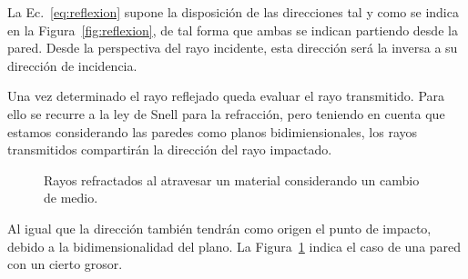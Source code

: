 La Ec.~\eqref{eq:reflexion} supone la disposición de las direcciones tal y como se indica en la Figura~\ref{fig:reflexion}, de tal forma que ambas se indican partiendo desde la pared.
Desde la perspectiva del rayo incidente, esta dirección será la inversa a su dirección de incidencia.


Una vez determinado el rayo reflejado queda evaluar el rayo transmitido.
Para ello se recurre a la ley de Snell para la refracción, pero teniendo en cuenta que estamos considerando las paredes como planos bidimiensionales, los rayos transmitidos compartirán la dirección del rayo impactado.

\begin{figure}[H]
    \centering
    \caption{Rayos refractados al atravesar un material considerando un cambio de medio.}
    \label{fig:snell_plano}
\end{figure}

Al igual que la dirección también tendrán como origen el punto de impacto, debido a la bidimensionalidad del plano.
La Figura~\ref{fig:snell_plano} indica el caso de una pared con un cierto grosor.

